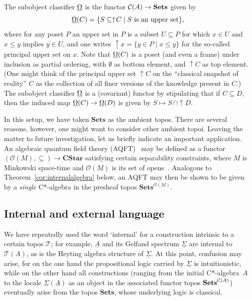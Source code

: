 \documentclass[12pt]{article}
\newcommand{\beq}{\begin{equation}}
\newcommand{\eeq}{\end{equation}}
\newcommand{\Sets}{\mbox{\textbf{Sets}}}
\newcommand{\ca}{C*-algebra} \newcommand{\jba}{JB-algebra}
\newcommand{\raw}{\rightarrow} \newcommand{\rat}{\mapsto}
\newcommand{\CA}{{\mathcal A}} \newcommand{\CB}{{\mathcal B}}
\newcommand{\CT}{{\mathcal T}} \newcommand{\CV}{{\mathcal V}}
\newcommand{\alg}[1]{\ensuremath{#1}}
\newcommand{\functor}[1]{\ensuremath{\underline{#1}}}
\newcommand{\Cat}[1]{\ensuremath{\mathrm{\textbf{#1}}}}
\newcommand{\Cstar}{\Cat{CStar}\xspace}
\newcommand{\Set}{\Cat{Sets}\xspace}
\newcommand{\context}{\ensuremath{\mathcal{C}}}
\newcommand{\asstopos}{\ensuremath{\mathcal{T}}}
\newcommand{\opens}{\ensuremath{\mathcal{O}}}
\newcommand{\uA}{\underline{A}}
\renewcommand{\CA}{\mathcal{C}(A)}
\newcommand{\TA}{\mathcal{T}(A)}
\newcommand{\ulS}{\functor{\Sigma}}
\renewcommand{\TA}{\asstopos(\alg{A})}
\renewcommand{\CA}{\context(\alg{A})}
\begin{document}
The subobject classifier $\underline{\Omega}$ is the functor
$\CA\raw\Sets$ given by
\beq
  \underline{\Om}(\alg{C}) = \{ S \subseteq \uparrow\! C \mid S
  \mbox{ is an upper set}\}, \label{cosieves}
\eeq
where for any poset $P$  an upper set in $P$ is a subset
 $U\subseteq P$ for which $x\in
U$ and $x\leqslant y$ implies $y\in U$, and one writes  $\uparrow\!  x=\{y\in P\mid
x\leqslant y\}$ for the so-called principal upper set on $x$.
Note that $\underline{\Om}(\alg{C})$ is a poset (and even a frame) under inclusion as partial ordering, with
$\emptyset$ as bottom element, and $\uparrow\! C$ as top element.
 (One might 
think of the principal upper set $\uparrow\! C$ on the  ``classical snapshot of reality'' $\alg{C}$ as the collection of all finer versions of the knowledge present in
$\alg{C}$.) The subobject classifier $\underline{\Omega}$ is a
(covariant) functor by stipulating that if $C\subseteq D$, then the induced map $\underline{\Om}(\alg{C})\raw \underline{\Om}(\alg{D})$ is given by $S\mapsto S\, \cap \uparrow\! D$.

In this setup, we have taken $\Set$ as the ambient
  topos.  There are several reasons, however,  one might want to consider other
ambient
  topoi. Leaving the matter to future investigation, let us briefly indicate
 an important application.
  An algebraic quantum field theory (AQFT)~\cite{Haag:LQP} may be defined
as a functor
  \hbox{$(\opens(M), \subseteq) \to \Cstar$} satisfying certain
  separability constraints, where $M$ is Minkowski space-time and
  $\opens(M)$ is its set of
  opens~\cite{BrunettiFredenhagenVerch}. Analogous to
Theorem~\ref{cor:internalalgebra} below, an AQFT may then be shown to be given
by a {\it single}
  C*-algebra in the presheaf topos $\Set^{\opens(M)}$.
\subsection{Internal and external language}\label{Intext}
We have repeatedly used the word `internal' for a construction intrinsic to a
certain topos $\CT$;
for example, $\uA$ and its Gelfand spectrum $\ulS$ are internal to $\TA$, as is
the Heyting algebra
structure of $\ulS$. At this point, confusion may arise, for on the one hand the
propositional logic carried
by $\ulS$ is intuitionistic, while on the other hand all constructions (ranging
from the initial \ca\ $A$ to
the locale $\ulS(\uA)$ as an object in the
associated functor topos $\Sets^{\CA}$)
eventually arise from the topos \Sets, whose underlying logic is classical.
\end{document}
